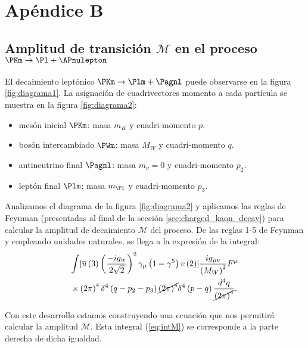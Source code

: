 \appendix
\chapter*{Apéndice B}\label{cap:B}
\setcounter{section}{0}
\renewcommand{\thesection}{B.\arabic{section}}
\setcounter{table}{0}
\renewcommand{\thetable}{B.\arabic{table}}
\setcounter{equation}{0}
\renewcommand{\theequation}{B.\arabic{equation}}

\section{Amplitud de transición $\mathcal{M}$ en el proceso $\PKm \rightarrow \Pl + \APnulepton$}\label{sec:detailed_calc}

El decaimiento leptónico $\PKm \rightarrow \Plm + \Pagnl$ puede observarse en la figura \ref{fig:diagrama1}. La asignación de cuadrivectores momento a cada partícula se muestra en la figura \ref{fig:diagrama2}:
\begin{itemize}
\setlength{\itemsep}{0.2\baselineskip}
\item mesón inicial $\PKm$: masa $m_K$ y cuadri-momento $p$.
\item bosón intercambiado $\PWm$: masa $M_W$ y cuadri-momento $q$.
\item antineutrino final $\Pagnl$: masa $m_{\nu}=0$ y cuadri-momento $p_2$.
\item leptón final $\Plm$: masa $m_{\Pl}$ y cuadri-momento $p_3$.
\end{itemize}

Analizamos el diagrama de la figura \ref{fig:diagrama2} y aplicamos las reglas de Feynman (presentadas al final de la sección \ref{sec:charged_kaon_decay}) para calcular la amplitud de decaimiento $\mathcal{M}$ del proceso. De las reglas 1-5 de Feynman y empleando unidades naturales, se llega a la expresión de la integral:
\begin{multline}
\int[\overline{u}\left( 3\right) \left( \dfrac{-ig_w}{2\sqrt{2}}\right) ^{2}\gamma _{\mu }\left( 1-\gamma ^{5}\right) v\left( 2\right)]\dfrac{ig{_{\mu \nu}}}{\left( M_W\right)^{2}}F^{\mu}\\ \times \left( 2\pi \right) ^{4}\delta ^{4}\left( q-p_{2}-p_{3}\right) \cancel{\left( 2\pi \right)^{4}}\delta ^{4}\left( p-q\right) \dfrac{d^{4}q}{\cancel{\left( 2\pi \right) ^{4}}} . \label{eq:intM}
\end{multline}

Con este desarrollo estamos construyendo una ecuación que nos permitirá calcular la amplitud $\mathcal{M}$. Esta integral (\ref{eq:intM}) se corresponde a la parte derecha de dicha igualdad.

